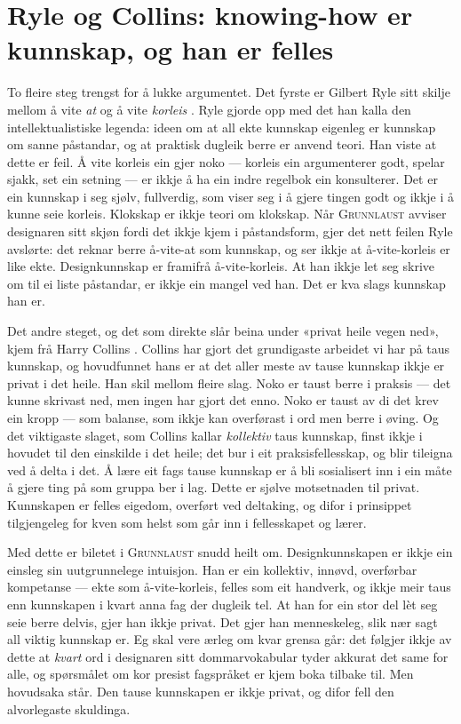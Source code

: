 \section{Ryle og Collins: knowing-how er kunnskap, og han er felles}

To fleire steg trengst for å lukke argumentet. Det fyrste er Gilbert Ryle sitt skilje mellom å vite \emph{at} og å vite \emph{korleis} \autocite{ryle1949mind}. Ryle gjorde opp med det han kalla den intellektualistiske legenda: ideen om at all ekte kunnskap eigenleg er kunnskap om sanne påstandar, og at praktisk dugleik berre er anvend teori. Han viste at dette er feil. Å vite korleis ein gjer noko — korleis ein argumenterer godt, spelar sjakk, set ein setning — er ikkje å ha ein indre regelbok ein konsulterer. Det er ein kunnskap i seg sjølv, fullverdig, som viser seg i å gjere tingen godt og ikkje i å kunne seie korleis. Klokskap er ikkje teori om klokskap. Når \textsc{Grunnlaust} avviser designaren sitt skjøn fordi det ikkje kjem i påstandsform, gjer det nett feilen Ryle avslørte: det reknar berre å-vite-at som kunnskap, og ser ikkje at å-vite-korleis er like ekte. Designkunnskap er framifrå å-vite-korleis. At han ikkje let seg skrive om til ei liste påstandar, er ikkje ein mangel ved han. Det er kva slags kunnskap han er.

Det andre steget, og det som direkte slår beina under «privat heile vegen ned», kjem frå Harry Collins \autocite{collins2010tacit}. Collins har gjort det grundigaste arbeidet vi har på taus kunnskap, og hovudfunnet hans er at det aller meste av tause kunnskap ikkje er privat i det heile. Han skil mellom fleire slag. Noko er taust berre i praksis — det kunne skrivast ned, men ingen har gjort det enno. Noko er taust av di det krev ein kropp — som balanse, som ikkje kan overførast i ord men berre i øving. Og det viktigaste slaget, som Collins kallar \emph{kollektiv} taus kunnskap, finst ikkje i hovudet til den einskilde i det heile; det bur i eit praksisfellesskap, og blir tileigna ved å delta i det. Å lære eit fags tause kunnskap er å bli sosialisert inn i ein måte å gjere ting på som gruppa ber i lag. Dette er sjølve motsetnaden til privat. Kunnskapen er felles eigedom, overført ved deltaking, og difor i prinsippet tilgjengeleg for kven som helst som går inn i fellesskapet og lærer.

Med dette er biletet i \textsc{Grunnlaust} snudd heilt om. Designkunnskapen er ikkje ein einsleg sin uutgrunnelege intuisjon. Han er ein kollektiv, innøvd, overførbar kompetanse — ekte som å-vite-korleis, felles som eit handverk, og ikkje meir taus enn kunnskapen i kvart anna fag der dugleik tel. At han for ein stor del lèt seg seie berre delvis, gjer han ikkje privat. Det gjer han menneskeleg, slik nær sagt all viktig kunnskap er. Eg skal vere ærleg om kvar grensa går: det følgjer ikkje av dette at \emph{kvart} ord i designaren sitt dommarvokabular tyder akkurat det same for alle, og spørsmålet om kor presist fagspråket er kjem boka tilbake til. Men hovudsaka står. Den tause kunnskapen er ikkje privat, og difor fell den alvorlegaste skuldinga.

